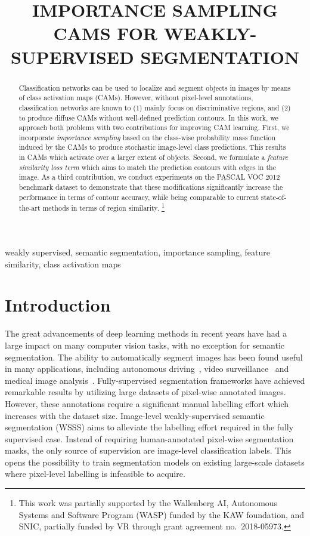 \documentclass{article}
\title{IMPORTANCE SAMPLING CAMS FOR WEAKLY-SUPERVISED SEGMENTATION}
\newcommand\blfootnote[1]{\begingroup
  \renewcommand\thefootnote{}\footnote{#1}\addtocounter{footnote}{-1}\endgroup
}
\begin{document}
\ninept
\maketitle
\begin{abstract}
Classification networks can be used to localize and segment objects in images by means of class activation maps (CAMs). However, without pixel-level annotations, classification networks are known to (1) mainly focus on discriminative regions, and (2) to produce diffuse CAMs without well-defined prediction contours. In this work, we approach both problems with two contributions for improving CAM learning. First, we incorporate \textit{importance sampling} based on the class-wise probability mass function induced by the CAMs to produce stochastic image-level class predictions. This results in CAMs which activate over a larger extent of objects. Second, we formulate a \textit{feature similarity loss term} which aims to match the prediction contours with edges in the image. As a third contribution, we conduct experiments on the PASCAL VOC 2012 benchmark dataset to demonstrate that these modifications significantly increase the performance in terms of contour accuracy, while being comparable to current state-of-the-art methods in terms of region similarity.\blfootnote{This work was partially supported by the Wallenberg AI, Autonomous Systems and Software Program (WASP) funded by the KAW foundation, and SNIC, partially funded by VR through grant agreement no.~2018-05973.}
\end{abstract}

\begin{keywords}
weakly supervised, semantic segmentation, importance sampling, feature similarity, class activation maps
\end{keywords}

\section{Introduction}
\label{sec_introduction}

The great advancements of deep learning methods in recent years have had a large impact on many computer vision tasks, with no exception for semantic segmentation. The ability to automatically segment images has been found useful in many applications, including autonomous driving~\cite{cordts2016cvpr}, video surveillance~\cite{gruosso2021mta} and medical image analysis~\cite{minaee2021tpami}. Fully-supervised segmentation frameworks have achieved remarkable results by utilizing large datasets of pixel-wise annotated images. However, these annotations require a significant manual labelling effort which increases with the dataset size. Image-level weakly-supervised semantic segmentation (WSSS) aims to alleviate the labelling effort required in the fully supervised case. Instead of requiring human-annotated pixel-wise segmentation masks, the only source of supervision are image-level classification labels. This opens the possibility to train segmentation models on existing large-scale datasets where pixel-level labelling is infeasible to acquire.
\end{document}
